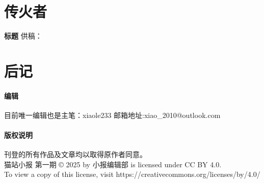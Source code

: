 \documentclass[UTF8,fontset=fandol]{article}
\begin{document}
\pagebreak
\section{传火者}
\begin{center}
	\textbf{标题}
	\normalsize
	供稿：
\end{center}


\section{后记}
\paragraph{编辑} 目前唯一编辑也是主笔：xiaole233 邮箱地址:xiao\_2010@outlook.com
\paragraph{版权说明} 刊登的所有作品及文章均以取得原作者同意。\\ 
猫站小报 第一期  © 2025 by 小报编辑部 is licensed under CC BY 4.0.\\ To view a copy of this license, visit https://creativecommons.org/licenses/by/4.0/
\end{document}
